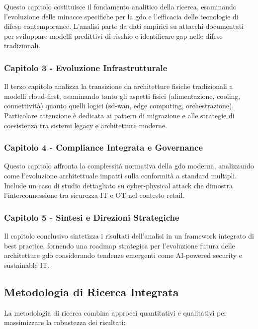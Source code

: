 Questo capitolo costituisce il fondamento analitico della ricerca, esaminando l'evoluzione delle minacce specifiche per la \gls{gdo} e l'efficacia delle tecnologie di difesa contemporanee. L'analisi parte da dati empirici su attacchi documentati per sviluppare modelli predittivi di rischio e identificare gap nelle difese tradizionali.

\subsubsection{Capitolo 3 - Evoluzione Infrastrutturale}

Il terzo capitolo analizza la transizione da architetture fisiche tradizionali a modelli cloud-first, esaminando tanto gli aspetti fisici (alimentazione, cooling, connettività) quanto quelli logici (\gls{sd-wan}, edge computing, orchestrazione). Particolare attenzione è dedicata ai pattern di migrazione e alle strategie di coesistenza tra sistemi legacy e architetture moderne.

\subsubsection{Capitolo 4 - Compliance Integrata e Governance}

Questo capitolo affronta la complessità normativa della \gls{gdo} moderna, analizzando come l'evoluzione architettuale impatti sulla conformità a standard multipli. Include un caso di studio dettagliato su cyber-physical attack che dimostra l'interconnessione tra sicurezza IT e OT nel contesto retail.

\subsubsection{Capitolo 5 - Sintesi e Direzioni Strategiche}

Il capitolo conclusivo sintetizza i risultati dell'analisi in un framework integrato di best practice, fornendo una roadmap strategica per l'evoluzione futura delle architetture \gls{gdo} considerando tendenze emergenti come AI-powered security e sustainable IT.

\subsection{Metodologia di Ricerca Integrata}
\label{subsec:metodologia-integrata}

La metodologia di ricerca combina approcci quantitativi e qualitativi per massimizzare la robustezza dei risultati:

